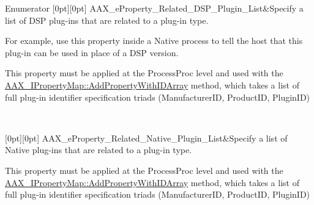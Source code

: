 \begin{DoxyEnumFields}{Enumerator}
[0pt][0pt]{}\mbox{\label{a00662_a13e384f22825afd3db6d68395b79ce0da9dc35184d705e963f14f85df4d71193d}} 
A\+A\+X\+\_\+e\+Property\+\_\+\+Related\+\_\+\+D\+S\+P\+\_\+\+Plugin\+\_\+\+List&Specify a list of D\+SP plug-\/ins that are related to a plug-\/in type. \begin{DoxyItemize}
\item For example, use this property inside a Native process to tell the host that this plug-\/in can be used in place of a D\+SP version. \item This property must be applied at the Process\+Proc level and used with the \mbox{\hyperlink{a01869_a8b7dee1eeafd7b6c0427a99386d02dd8}{A\+A\+X\+\_\+\+I\+Property\+Map\+::\+Add\+Property\+With\+I\+D\+Array}} method, which takes a list of full plug-\/in identifier specification triads (Manufacturer\+ID, Product\+ID, Plugin\+ID) \end{DoxyItemize}
\\
\hline

[0pt][0pt]{}\mbox{\label{a00662_a13e384f22825afd3db6d68395b79ce0dae47f50370ae2f6bf29b8cacc6a41d924}} 
A\+A\+X\+\_\+e\+Property\+\_\+\+Related\+\_\+\+Native\+\_\+\+Plugin\+\_\+\+List&Specify a list of Native plug-\/ins that are related to a plug-\/in type. \begin{DoxyItemize}
\item This property must be applied at the Process\+Proc level and used with the \mbox{\hyperlink{a01869_a8b7dee1eeafd7b6c0427a99386d02dd8}{A\+A\+X\+\_\+\+I\+Property\+Map\+::\+Add\+Property\+With\+I\+D\+Array}} method, which takes a list of full plug-\/in identifier specification triads (Manufacturer\+ID, Product\+ID, Plugin\+ID) \end{DoxyItemize}
\\
\hline


\end{DoxyEnumFields}
